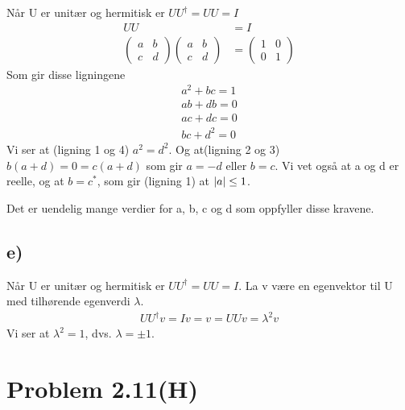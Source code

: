 \documentclass[norsk,a4paper,12pt]{article}
\begin{document}
		Når U er unitær og hermitisk er $UU^\dagger = UU = I$
		\begin{equation}
		\begin{aligned}
		UU &= I \\
		\begin{pmatrix} a & b \\ c & d \end{pmatrix} \begin{pmatrix} a & b \\ c & d \end{pmatrix} &= \begin{pmatrix} 1 & 0 \\ 0 & 1 \end{pmatrix}
		\end{aligned}
		\end{equation}
		Som gir disse ligningene
		\begin{equation}
		\begin{aligned}
		a^2 +bc = 1 \\
		ab + db = 0 \\
		ac + dc = 0 \\
		bc + d^2 = 0
		\end{aligned}
		\end{equation}
		Vi ser at (ligning 1 og 4) $a^2 = d^2$. Og at(ligning 2 og 3) $b(a + d) = 0 = c(a + d)$ som gir $a = -d$ eller $b = c$. Vi vet også at a og d er reelle, og at $b = c^*$, som gir (ligning 1) at $\abs{a} \leq 1$. 
		
		Det er uendelig mange verdier for a, b, c og d som oppfyller disse kravene.
		
	\subsection*{e)}
		
		Når U er unitær og hermitisk er $UU^\dagger = UU = I$. La v være en egenvektor til U med tilhørende egenverdi $\lambda$.
		\begin{equation}
		\begin{aligned}
		UU^\dagger v = Iv = v = UUv = \lambda^2 v 
		\end{aligned}
		\end{equation}
		Vi ser at $\lambda^2 = 1$, dvs. $\lambda = \pm 1$.
		
	\section*{Problem 2.11(H)}
	
\end{document}
